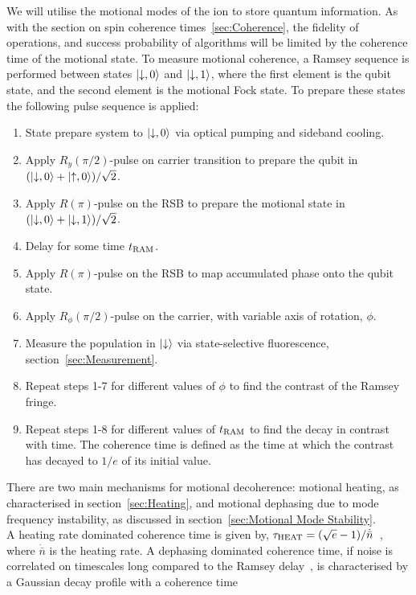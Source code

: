     We will utilise the motional modes of the ion to store quantum information.
    As with the section on spin coherence times~\ref{sec:Coherence}, the
    fidelity of operations, and success probability of algorithms will be
    limited by the coherence time of the motional state.  To measure motional
    coherence, a Ramsey sequence is performed between states $\ket{\downarrow, 0}$
    and $\ket{\downarrow, 1}$, where the first element is the qubit
    state, and the second element is the motional Fock state. To prepare these
    states the following pulse sequence is applied:
    \begin{enumerate}
    \item State prepare system to $\ket{\downarrow, 0}$ via optical pumping and sideband cooling.
    \item Apply $R_y(\pi/2)$-pulse on carrier transition to prepare the qubit in $(\ket{\downarrow, 0} + \ket{\uparrow, 0})/\sqrt{2}$.
    \item Apply $R(\pi)$-pulse on the RSB to prepare the motional state in $(\ket{\downarrow, 0} + \ket{\downarrow, 1})/\sqrt{2}$.
    \item Delay for some time $t_{\rm RAM}$.
    \item Apply $R(\pi)$-pulse on the RSB to map accumulated phase onto the qubit state.
    \item Apply $R_\phi(\pi/2)$-pulse on the carrier, with variable axis of rotation, $\phi$.
    \item Measure the population in $\ket{\downarrow}$ via state-selective fluorescence, section~\ref{sec:Measurement}.
    \item Repeat steps 1-7 for different values of $\phi$ to find the contrast of the Ramsey fringe.
    \item Repeat steps 1-8 for different values of $t_{\rm RAM}$ to find the decay in contrast with time. The coherence time is defined as the time at which the contrast has decayed to $1/e$ of its initial value.
    \end{enumerate}
    There are two main mechanisms for motional decoherence\cite{turchette2000decoherence}: motional heating, as
    characterised in section~\ref{sec:Heating}, and motional dephasing due to
    mode frequency instability, as discussed in section~\ref{sec:Motional Mode Stability}. \\
    A heating rate dominated coherence time is given by, $\tau_{\rm HEAT} =
    (\sqrt{e}-1)/\dot{\bar{n}}$~\cite{turchette2000decoherence}, where $\dot{\bar{n}}$ is the heating
    rate. A dephasing dominated coherence time, if noise is correlated on timescales long compared to the Ramsey delay~\cite{omalley2015qubit}, is characterised by a Gaussian decay profile with a coherence time
